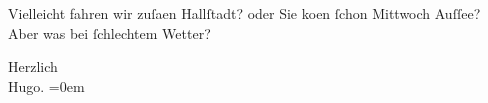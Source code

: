 \pstart
           Vielleicht fahren wir zuſa{\geminationm}en Hallſtadt? oder Sie ko{\geminationm}en{ }ſchon
               Mittwoch Auſſee? Aber was bei{ }ſchlechtem
               Wetter?\pend
           
\pstart
           Herzlich{\\[\baselineskip]}\spacefill\mbox{Hugo.}\pend
           \leftskip=0em{}\endnumbering{}  \newcommand{\dateiname}{L00958}\newcommand{\titel}{Hugo von Hofmannsthal an Arthur Schnitzler, [13. 8. 1899]}\newcommand{\editorInnen}{Martin Anton Müller und Gerd-Hermann Susen}
